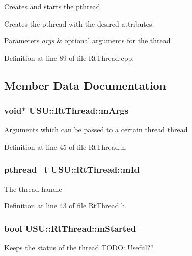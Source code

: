 \-Creates and starts the pthread. 

\-Creates the pthread with the desired attributes.


\begin{DoxyParams}{\-Parameters}
{\em args} & optional arguments for the thread \\
\hline
\end{DoxyParams}


\-Definition at line 89 of file \-Rt\-Thread.\-cpp.



\subsection{\-Member \-Data \-Documentation}
\hypertarget{class_u_s_u_1_1_rt_thread_a5213699b8def7e9e2af0add4648b8b40}{
\subsubsection[{m\-Args}]{\setlength{\rightskip}{0pt plus 5cm}void$\ast$ {\bf \-U\-S\-U\-::\-Rt\-Thread\-::m\-Args}}}\label{class_u_s_u_1_1_rt_thread_a5213699b8def7e9e2af0add4648b8b40}
\-Arguments which can be passed to a certain thread thread 

\-Definition at line 45 of file \-Rt\-Thread.\-h.

\hypertarget{class_u_s_u_1_1_rt_thread_afe45711f791a727426c6b0e23add03a8}{
\subsubsection[{m\-Id}]{\setlength{\rightskip}{0pt plus 5cm}pthread\-\_\-t {\bf \-U\-S\-U\-::\-Rt\-Thread\-::m\-Id}}}\label{class_u_s_u_1_1_rt_thread_afe45711f791a727426c6b0e23add03a8}
\-The thread handle 

\-Definition at line 43 of file \-Rt\-Thread.\-h.

\hypertarget{class_u_s_u_1_1_rt_thread_a990cc76b2f9541a6dbafdfa6be5fd367}{
\subsubsection[{m\-Started}]{\setlength{\rightskip}{0pt plus 5cm}bool {\bf \-U\-S\-U\-::\-Rt\-Thread\-::m\-Started}}}\label{class_u_s_u_1_1_rt_thread_a990cc76b2f9541a6dbafdfa6be5fd367}
\-Keeps the status of the thread \-T\-O\-D\-O\-: \-Useful?? 

